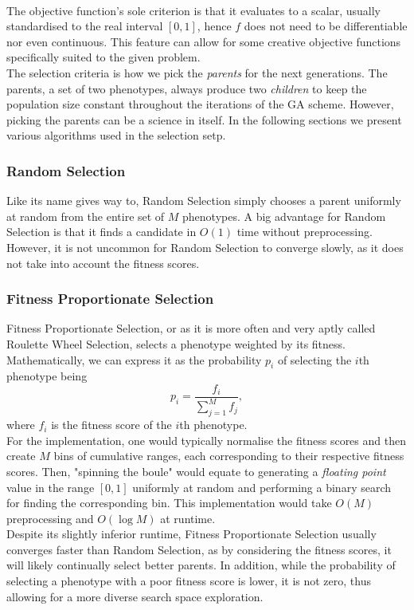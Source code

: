 \\
The objective function's sole criterion is that it evaluates to a scalar, usually standardised to the real interval $[0,1]$, hence $f$ does not need to be differentiable nor even continuous. This feature can allow for some creative objective functions specifically suited to the given problem.
\\
The selection criteria is how we pick the \textit{parents} for the next generations. The parents, a set of two phenotypes, always produce two \textit{children} to keep the population size constant throughout the iterations of the GA scheme. However, picking the parents can be a science in itself. In the following sections we present various algorithms used in the selection setp.

\subsubsection{Random Selection}
Like its name gives way to, Random Selection simply chooses a parent uniformly at random from the entire set of $M$ phenotypes. A big advantage for Random Selection is that it finds a candidate in $O(1)$ time without preprocessing. However, it is not uncommon for Random Selection to converge slowly, as it does not take into account the fitness scores. 

\subsubsection{Fitness Proportionate Selection}
Fitness Proportionate Selection, or as it is more often and very aptly called Roulette Wheel Selection, selects a phenotype weighted by its fitness. Mathematically, we can express it as the probability $p_i$ of selecting the $i$th phenotype being
\begin{equation*}
    p_i = \frac{f_i}{\sum_{j = 1}^M f_j},
\end{equation*}
where $f_i$ is the fitness score of the $i$th phenotype.
\\
For the implementation, one would typically normalise the fitness scores and then create $M$ bins of cumulative ranges, each corresponding to their respective fitness scores. Then, "spinning the boule" would equate to generating a \textit{floating point} value in the range $[0,1]$ uniformly at random and performing a binary search for finding the corresponding bin. This implementation would take $O(M)$ preprocessing and $O(\log M )$ at runtime. 
\\
Despite its slightly inferior runtime, Fitness Proportionate Selection usually converges faster than Random Selection, as by considering the fitness scores, it will likely continually select better parents. In addition, while the probability of selecting a phenotype with a poor fitness score is lower, it is not zero, thus allowing for a more diverse search space exploration.   

